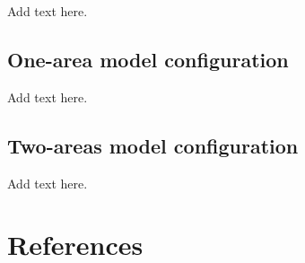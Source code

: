 \documentclass[
]{scrartcl}
\begin{document}
Add text here.

\newpage{}

\subsection{One-area model
configuration}\label{one-area-model-configuration}

Add text here.

\newpage{}

\subsection{Two-areas model
configuration}\label{two-areas-model-configuration}

Add text here.

\newpage{}

\section*{References}\label{references}
\end{document}
